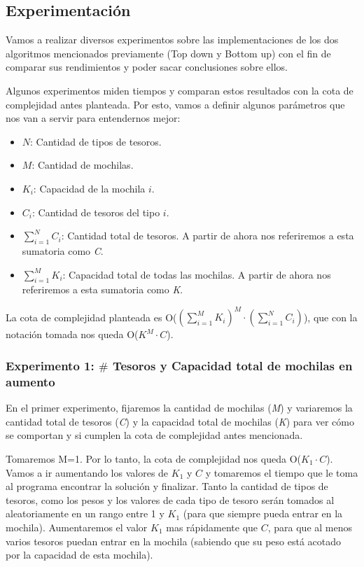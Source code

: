 \subsection{Experimentación}

\par Vamos a realizar diversos experimentos sobre las implementaciones de los dos algoritmos mencionados previamente (Top down y Bottom up) con el fin de comparar sus rendimientos y poder sacar conclusiones sobre ellos.

\par Algunos experimentos miden tiempos y comparan estos resultados con la cota de complejidad antes planteada. Por esto, vamos a definir algunos parámetros que nos van a servir para entendernos mejor:

\begin{itemize}
	\item \textit{$N$}: Cantidad de tipos de tesoros.
	\item \textit{$M$}: Cantidad de mochilas.
	\item \textit{$K_i$}: Capacidad de la mochila $i$.
	\item \textit{$C_i$}: Cantidad de tesoros del tipo $i$.
	\item \textit{$\sum_{i = 1}^{N} C_i$}: Cantidad total de tesoros. A partir de ahora nos referiremos a esta sumatoria como \textit{C}.
	\item \textit{$\sum_{i = 1}^{M} K_i$}: Capacidad total de todas las mochilas. A partir de ahora nos referiremos a esta sumatoria como \textit{K}.
\end{itemize}

\par La cota de complejidad planteada es O($(\sum_{i = 1}^{M} K_i)^{M} \cdot (\sum_{i = 1}^{N} C_i)$), que con la notación tomada nos queda O($K^{M} \cdot C$).

\subsubsection{Experimento 1: $\#$ Tesoros y Capacidad total de mochilas en aumento}

\par En el primer experimento, fijaremos la cantidad de mochilas (\textit{M}) y variaremos la cantidad total de tesoros (\textit{C}) y la capacidad total de mochilas (\textit{K}) para ver cómo se comportan y si cumplen la cota de complejidad antes mencionada.

\par Tomaremos M=1. Por lo tanto, la cota de complejidad nos queda O($K_1 \cdot C$). Vamos a ir aumentando los valores de $K_1$ y $C$ y tomaremos el tiempo que le toma al programa encontrar la solución y finalizar. Tanto la cantidad de tipos de tesoros, como los pesos y los valores de cada tipo de tesoro serán tomados al aleatoriamente en un rango entre 1 y $K_1$ (para que siempre pueda entrar en la mochila). Aumentaremos el valor $K_1$ mas rápidamente que $C$, para que al menos varios tesoros puedan entrar en la mochila (sabiendo que su peso está acotado por la capacidad de esta mochila).

